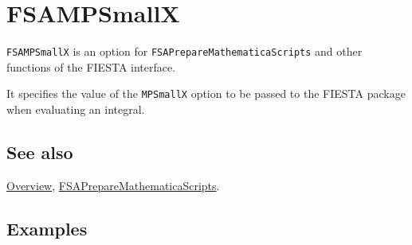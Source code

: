 \documentclass[../FeynHelpersManual.tex]{subfiles}
\begin{document}
\hypertarget{fsampsmallx}{
\section{FSAMPSmallX}\label{fsampsmallx}}

\texttt{FSAMPSmallX} is an option for
\texttt{FSAPrepareMathematicaScripts} and other functions of the FIESTA
interface.

It specifies the value of the \texttt{MPSmallX} option to be passed to
the FIESTA package when evaluating an integral.

\subsection{See also}

\hyperlink{toc}{Overview},
\hyperlink{fsapreparemathematicascripts}{FSAPrepareMathematicaScripts}.

\subsection{Examples}
\end{document}

